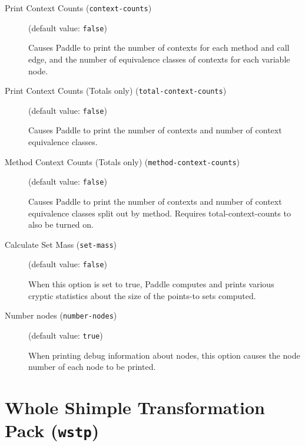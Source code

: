 \documentclass{article}
\begin{document}
\begin{description}

\item[Print Context Counts ({\tt context-counts})]
(default value: {\tt false})




Causes Paddle to print the number of contexts for each method and
call edge, and the number of equivalence classes of contexts for
each variable node.
        


\item[Print Context Counts (Totals only) ({\tt total-context-counts})]
(default value: {\tt false})




Causes Paddle to print the number of contexts and number of context
equivalence classes.
        


\item[Method Context Counts (Totals only) ({\tt method-context-counts})]
(default value: {\tt false})




Causes Paddle to print the number of contexts and number of context
equivalence classes split out by method. Requires total-context-counts to also be turned on.
        


\item[Calculate Set Mass ({\tt set-mass})]
(default value: {\tt false})




When this option is set to true, Paddle computes and prints various
cryptic statistics about the size of the points-to sets computed.
        


\item[Number nodes ({\tt number-nodes})]
(default value: {\tt true})




When printing debug information about nodes, this option causes the node number
of each node to be printed.
        


\end{description}

\section{Whole Shimple Transformation Pack ({\tt wstp})}
\end{document}
